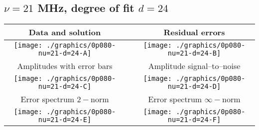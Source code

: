 

% 

\clearpage{}
\break{}

\subsection{$\nu = 21$ MHz, degree of fit $d = 24$}

\begin{table}[h]
    \begin{center}
        \begin{tabular}{ccc}
            Data and solution & \quad & Residual errors \\\hline
            \texttt{[image: ./graphics/0p080-nu=21-d=24-A]} &&
            \texttt{[image: ./graphics/0p080-nu=21-d=24-B]} \\[15pt]
            Amplitudes with error bars && Amplitude signal--to--noise \\\hline
            \texttt{[image: ./graphics/0p080-nu=21-d=24-C]} &&
            \texttt{[image: ./graphics/0p080-nu=21-d=24-D]} \\[15pt]
            Error spectrum $2-$norm && Error spectrum $\infty-$norm \\\hline
            \texttt{[image: ./graphics/0p080-nu=21-d=24-E]} &&
            \texttt{[image: ./graphics/0p080-nu=21-d=24-F]} \\[15pt]
        \end{tabular}
    \end{center}
\label{fig:elev=80, nu=21}
\end{table}



\endinput
